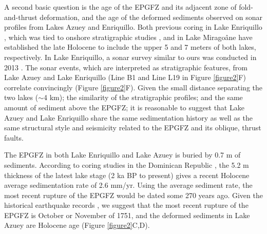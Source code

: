 \documentclass{nature}
\begin{document}
A second basic question is the age of the EPGFZ and its adjacent zone of fold-and-thrust deformation, and the age of the deformed sediments observed on sonar profiles from Lakes Azuey and Enriquillo. Both previous coring in Lake Enriquillo \citep{rios2013holocene}, which was tied to onshore stratigraphic studies \citep{taylor1985stratigraphy,rios2013holocene}, and in Lake Mirago\^ane \citep{higuera199910} have established the late Holocene to include the upper 5 and 7 meters of both lakes, respectively. In Lake Enriquillo, a sonar survey similar to ours was conducted in 2013 \citep{rios2013holocene}. The sonar events, which are interpreted as stratigraphic features, from Lake Azuey and Lake Enriquillo (Line B1 and Line L19 in Figure \ref{figure2}F) correlate convincingly (Figure \ref{figure2}F). Given the small distance separating the two lakes ($\sim$4 km); the similarity of the stratigraphic profiles; and the same amount of sediment above the EPGFZ; it is reasonable to suggest that Lake Azuey and Lake Enriquillo share the same sedimentation history as well as the same structural style and seismicity related to the EPGFZ and its oblique, thrust faults.

The EPGFZ in both Lake Enriquillo and Lake Azuey is buried by 0.7 m of sediments. According to coring studies in the Dominican Republic \citep{taylor1985stratigraphy,rios2013holocene}, the 5.2 m thickness of the latest lake stage (2 ka BP to present) gives a recent Holocene average sedimentation rate of 2.6 mm/yr. Using the average sediment rate, the most recent rupture of the EPGFZ would be dated some 270 years ago. Given the historical earthquake records \citep{bakun2012significant}, we suggest that the most recent rupture of the EPGFZ is October or November of 1751, and the deformed sediments in Lake Azuey are Holocene age (Figure \ref{figure2}C,D). 
%
\end{document}
